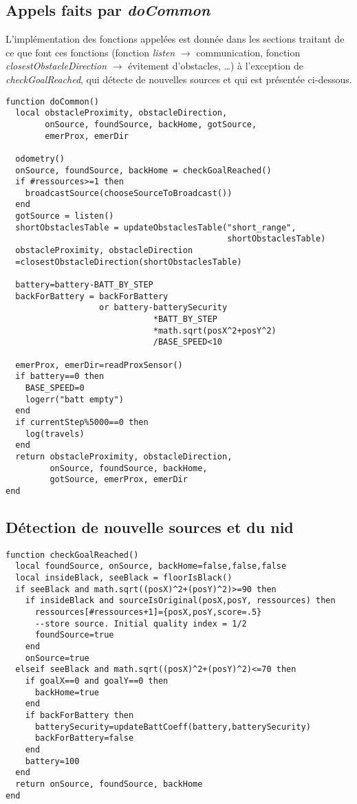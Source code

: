 \begin{subappendices}
  \subsection{Appels faits par \emph{doCommon}}

  L'implémentation des fonctions appelées est donnée dans les sections traitant de ce que font ces fonctions (fonction \emph{listen} $\rightarrow$ communication, fonction \emph{closestObstacleDirection} $\rightarrow$ évitement d'obstacles, \ldots) à l'exception de \emph{checkGoalReached}, qui détecte de nouvelles sources et qui est présentée ci-dessous.
\begin{lstlisting}[caption=fonction doCommon]
function doCommon()
  local obstacleProximity, obstacleDirection,
        onSource, foundSource, backHome, gotSource,
        emerProx, emerDir

  odometry()
  onSource, foundSource, backHome = checkGoalReached()
  if #ressources>=1 then
    broadcastSource(chooseSourceToBroadcast())
  end
  gotSource = listen()
  shortObstaclesTable = updateObstaclesTable("short_range",
                                             shortObstaclesTable)
  obstacleProximity, obstacleDirection
  =closestObstacleDirection(shortObstaclesTable)

  battery=battery-BATT_BY_STEP
  backForBattery = backForBattery
                   or battery-batterySecurity
                              *BATT_BY_STEP
                              *math.sqrt(posX^2+posY^2)
                              /BASE_SPEED<10

  emerProx, emerDir=readProxSensor()
  if battery==0 then
    BASE_SPEED=0
    logerr("batt empty")
  end
  if currentStep%5000==0 then
    log(travels)
  end
  return obstacleProximity, obstacleDirection,
         onSource, foundSource, backHome,
         gotSource, emerProx, emerDir
end
\end{lstlisting}

\subsection{Détection de nouvelle sources et du nid}

\begin{lstlisting}[caption=fonction checkGoalReached]
function checkGoalReached()
  local foundSource, onSource, backHome=false,false,false
  local insideBlack, seeBlack = floorIsBlack()
  if seeBlack and math.sqrt((posX)^2+(posY)^2)>=90 then
    if insideBlack and sourceIsOriginal(posX,posY, ressources) then
      ressources[#ressources+1]={posX,posY,score=.5}
      --store source. Initial quality index = 1/2
      foundSource=true
    end
    onSource=true
  elseif seeBlack and math.sqrt((posX)^2+(posY)^2)<=70 then
    if goalX==0 and goalY==0 then
      backHome=true
    end
    if backForBattery then
      batterySecurity=updateBattCoeff(battery,batterySecurity)
      backForBattery=false
    end
    battery=100
  end
  return onSource, foundSource, backHome
end
\end{lstlisting}


\end{subappendices}
